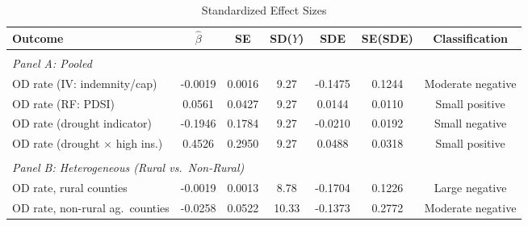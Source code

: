 \begin{table}[t]
\centering
\caption{Standardized Effect Sizes}
\label{tab:sde}
\footnotesize
\begin{tabular}{lcccccc}
\hline\hline
Outcome & $\hat{\beta}$ & SE & SD($Y$) & SDE & SE(SDE) & Classification \\
\hline
\\[-1.8ex]
\multicolumn{7}{l}{\textit{Panel A: Pooled}} \\[0.3ex]
OD rate (IV: indemnity/cap) & -0.0019 & 0.0016 & 9.27 & -0.1475 & 0.1244 & Moderate negative \\
OD rate (RF: PDSI) & 0.0561 & 0.0427 & 9.27 & 0.0144 & 0.0110 & Small positive \\
OD rate (drought indicator) & -0.1946 & 0.1784 & 9.27 & -0.0210 & 0.0192 & Small negative \\
OD rate (drought $\times$ high ins.) & 0.4526 & 0.2950 & 9.27 & 0.0488 & 0.0318 & Small positive \\
\\[-1.8ex]
\multicolumn{7}{l}{\textit{Panel B: Heterogeneous (Rural vs.\ Non-Rural)}} \\[0.3ex]
OD rate, rural counties & -0.0019 & 0.0013 & 8.78 & -0.1704 & 0.1226 & Large negative \\
OD rate, non-rural ag.\ counties & -0.0258 & 0.0522 & 10.33 & -0.1373 & 0.2772 & Moderate negative \\
\hline\hline

\end{tabular}
\end{table}
